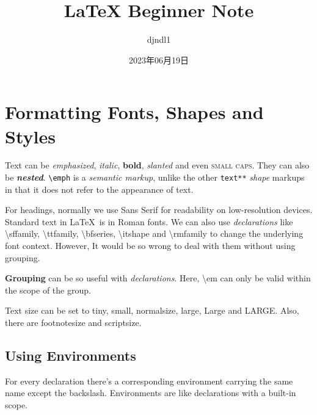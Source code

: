 \documentclass[a4paper,12pt]{article}
\newcommand{\code}[1]{\texttt{#1}}
\newcommand{\keyword}[2][\ttfamily]{{#1#2}}
\begin{document}
\title{LaTeX Beginner Note}
\author{djndl1}
\date{2023年06月19日}

\maketitle

\section{Formatting Fonts, Shapes and Styles}

Text can be \emph{emphasized}, \textit{italic}, \textbf{bold}, \textsl{slanted} and even \textsc{small caps}. They can also be \textbf{\textit{nested}}.
\code{\textbackslash emph} %
is a \emph{semantic markup}, unlike the other
\code{text**} \emph{shape}
markups in that it does not refer to the appearance of text.

For headings, normally we use \textsf{Sans Serif} for readability on low-resolution devices. Standard text in \LaTeX\ is in \textrm{Roman fonts}.
We can also use \emph{declarations} like \ttfamily \textbackslash sffamily, \textbackslash ttfamily, \textbackslash bfseries, \textbackslash itshape \normalfont and \ttfamily \textbackslash rmfamily \normalfont to change the underlying font context. However, It would be so wrong to deal with them without using grouping.



\keyword[\bfseries\sffamily]{Grouping} can be so useful with {\em declarations}. Here, {\ttfamily \textbackslash em} can only be valid within the {\ttfamily scope} of the group.

\noindent Text size can be set to {\tiny tiny}, {\small small}, {\normalsize normalsize}, {\large large}, {\Large Large} and {\LARGE LARGE}.
Also, there are {\footnotesize footnotesize} and {\scriptsize scriptsize}.


\subsection{Using Environments}

\begin{large}
  For every declaration there's a corresponding environment carrying the same name except the backslash.
  Environments are like declarations with a built-in scope.
\end{large}
\end{document}

